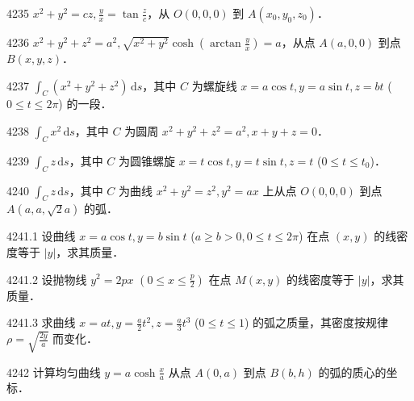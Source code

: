\begin{prob}[S]{4235}
$x^2+y^2 = cz, \frac{y}{x} = \tan\frac{z}{c}$，从 $O(0,0,0)$ 到 $A(x_0, y_0, z_0)$．
\end{prob}

\begin{prob}[S]{4236}
$x^2+y^2+z^2 = a^2, \sqrt{x^2+y^2}\cosh\left(\arctan\frac{y}{x}\right) = a$，从点 $A(a,0,0)$ 到点 $B(x,y,z)$．
\end{prob}


\begin{prob}[S]{4237}
$\displaystyle\int_C (x^2+y^2+z^2)\,\mathrm{d}s$，其中 $C$ 为螺旋线 $x = a\cos t, y = a\sin t, z = bt$ ($0 \leqslant t \leqslant 2\pi$) 的一段．
\end{prob}

\begin{prob}[S]{4238}
$\displaystyle\int_C x^2\,\mathrm{d}s$，其中 $C$ 为圆周 $x^2+y^2+z^2 = a^2, x+y+z = 0$．
\end{prob}

\begin{prob}[S]{4239}
$\displaystyle\int_C z\,\mathrm{d}s$，其中 $C$ 为圆锥螺旋 $x = t\cos t, y = t\sin t, z = t$ ($0 \leqslant t \leqslant t_0$)．
\end{prob}

\begin{prob}[S]{4240}
$\displaystyle\int_C z\,\mathrm{d}s$，其中 $C$ 为曲线 $x^2+y^2 = z^2, y^2 = ax$ 上从点 $O(0,0,0)$ 到点 $A(a, a, \sqrt{2}a)$ 的弧．
\end{prob}

\begin{prob}[M]{4241.1}
设曲线 $x = a\cos t, y = b\sin t$ ($a \geqslant b > 0, 0 \leqslant t \leqslant 2\pi$) 在点 $(x,y)$ 的线密度等于 $|y|$，求其质量．
\end{prob}

\begin{prob}[M]{4241.2}
设抛物线 $y^2 = 2px$ $\left(0 \leqslant x \leqslant \frac{p}{2}\right)$ 在点 $M(x,y)$ 的线密度等于 $|y|$，求其质量．
\end{prob}

\begin{prob}[M]{4241.3}
求曲线 $x = at, y = \frac{a}{2}t^2, z = \frac{a}{3}t^3$ ($0 \leqslant t \leqslant 1$) 的弧之质量，其密度按规律 $\rho = \sqrt{\frac{2y}{a}}$ 而变化．
\end{prob}

\begin{prob}[M]{4242}
计算均匀曲线 $y = a\cosh\frac{x}{a}$ 从点 $A(0,a)$ 到点 $B(b,h)$ 的弧的质心的坐标．
\end{prob}

